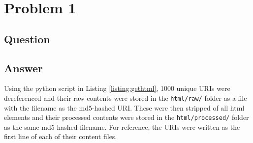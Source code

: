 \section{Problem 1}

\subsection{Question}
\vspace*{10pt}


\subsection{Answer}
\vspace{2mm}
Using the python script in Listing \ref{listing:gethtml}, 1000 unique URIs were dereferenced and
their raw contents were stored in the {\tt html/raw/} folder as a file with the filename as the
md5-hashed URI. These were then stripped of all html elements and their processed contents were 
stored in the {\tt html/processed/} folder as the same md5-hashed filename. For reference, the URIs were written as the first line of each of their content files.
\vspace{5mm}

\vspace*{5pt}
